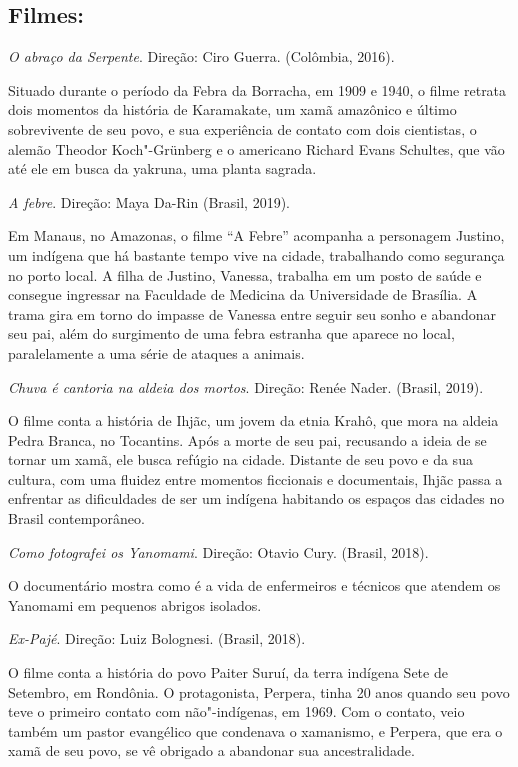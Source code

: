 \documentclass[12pt]{extarticle}
\begin{document}
{\subsection{Filmes:}

\textit{O abraço da Serpente}. Direção: Ciro Guerra. (Colômbia, 2016).

Situado durante o período da Febra da Borracha, em 1909 e 1940, o filme 
retrata dois momentos da história de Karamakate, um xamã amazônico e último 
sobrevivente de seu povo, e sua experiência de contato com dois cientistas, 
o alemão Theodor Koch"-Grünberg e o americano Richard Evans Schultes, que 
vão até ele em busca da yakruna, uma planta sagrada. 

\textit{A febre}. Direção: Maya Da-Rin (Brasil, 2019).

Em Manaus, no Amazonas, o filme ``A Febre'' acompanha a personagem Justino, um
indígena que há bastante tempo vive na cidade, trabalhando como segurança no 
porto local. A filha de Justino, Vanessa, trabalha em um posto de saúde e consegue 
ingressar na Faculdade de Medicina da Universidade de Brasília. 
A trama gira em torno do impasse de Vanessa entre seguir seu sonho e abandonar seu pai, além 
do surgimento de uma febra estranha que aparece no local, paralelamente a uma 
série de ataques a animais.

\textit{Chuva é cantoria na aldeia dos mortos}. Direção: Renée Nader. (Brasil, 2019).

O filme conta a história de Ihjãc, um jovem da etnia Krahô, que mora na aldeia Pedra 
Branca, no Tocantins. Após a morte de seu pai, recusando a ideia de se tornar um xamã, 
ele busca refúgio na cidade. Distante de seu povo e da sua cultura, com uma fluidez 
entre momentos ficcionais e documentais, Ihjãc passa a enfrentar as dificuldades de 
ser um indígena habitando os espaços das cidades no Brasil contemporâneo.

\textit{Como fotografei os Yanomami}. Direção: Otavio Cury. (Brasil,
2018).

O documentário mostra como é a vida de enfermeiros e técnicos que
atendem os Yanomami em pequenos abrigos isolados.

\textit{Ex-Pajé}. Direção: Luiz Bolognesi. (Brasil, 2018).

O filme conta a história do povo Paiter Suruí, da terra indígena Sete de 
Setembro, em Rondônia. O protagonista, Perpera, tinha 20 anos quando seu povo 
teve o primeiro contato com não"-indígenas, em 1969. Com o contato, veio também um pastor 
evangélico que condenava o xamanismo, e Perpera, que era o xamã de
seu povo, se vê obrigado a abandonar sua ancestralidade.

}
\end{document}
